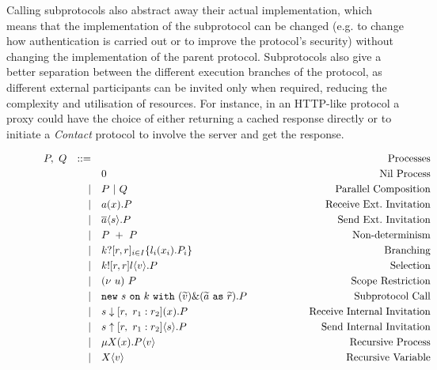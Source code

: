 \documentclass[12pt,twoside]{report}
\newcommand{\white}{\ \ \ \ \ \ \ \ \ \ \ \ }
\begin{document}
Calling subprotocols also abstract away their actual implementation, which means that the implementation of the subprotocol can be changed (e.g. to change how authentication is carried out or to improve the protocol's security) without changing the implementation of the parent protocol. Subprotocols also give a better separation between the different execution branches of the protocol, as different external participants can be invited only when required, reducing the complexity and utilisation of resources. For instance, in an HTTP-like protocol a proxy could have the choice of either returning a cached response directly or to initiate a \textit{Contact} protocol to involve the server and get the response. \\

\begin{figure}[h]
    \centering
    \begin{equation*}
    \centering
    \begin{array}{rrlcr}
        P,\ Q & ::= && \white & \text{Processes} \\[2.75pt]
             &   & 0 & \white & \text{Nil\ Process}  \\[2.75pt]
             & | & P\ |\ Q & \white & \text{Parallel\ Composition}  \\[2.75pt]
             & | & a(x).P & \white & \text{Receive\ Ext.\ Invitation} \\[2.75pt]
             & | & \overline{a}\langle s \rangle.P & \white & \text{Send\ Ext.\ Invitation} \\[2.75pt]
             & | & P\ +\ P & \white & \text{Non-determinism}\\[2.75pt]
             & | & k?[r, r]_{i \in I} \{l_i(x_i).P_i\}& \white & \text{Branching} \\[2.75pt]
             & | & k![r, r]l \langle v \rangle.P & \white & \text{Selection} \\[2.75pt]
             & | & (\nu\ u)\ P & \white & \text{Scope\ Restriction}\\[2.75pt] 
             & | & \texttt{new}\ s\ \texttt{on}\ k\ \texttt{with}\ (\widetilde{v})\&(\widetilde{a}\ \texttt{as}\ \widetilde{r}).P & \white & \text{Subprotocol\ Call}\\[2.75pt]
             & | & s \downarrow [r,\ r_1 : r_2](x).P & \white & \text{Receive\ Internal\ Invitation}\\[2.75pt]
             & | & s \uparrow [r,\ r_1 : r_2]\langle s \rangle.P & \white & \text{Send\ Internal\ Invitation}\\[2.75pt]
             & | & \mu X(x).P\langle v \rangle & \white  & \text{Recursive\ Process} \\[2.75pt]
             & | & X\langle v \rangle & \white  & \text{Recursive\ Variable}\\\\


\end{array}
\end{equation*}
\end{figure}
\end{document}

